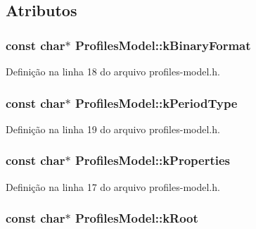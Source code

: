 \subsection{Atributos}
\subsubsection[{k\+Binary\+Format}]{\setlength{\rightskip}{0pt plus 5cm}const char$\ast$ Profiles\+Model\+::k\+Binary\+Format\hspace{0.3cm}{\ttfamily [static]}}\label{class_profiles_model_a3a78edee052fdbf9e4ffb894c2feb42f}


Definição na linha 18 do arquivo profiles-\/model.\+h.

\subsubsection[{k\+Period\+Type}]{\setlength{\rightskip}{0pt plus 5cm}const char$\ast$ Profiles\+Model\+::k\+Period\+Type\hspace{0.3cm}{\ttfamily [static]}}\label{class_profiles_model_a388efd77aaefa0ce4d687b3c79afbae6}


Definição na linha 19 do arquivo profiles-\/model.\+h.

\subsubsection[{k\+Properties}]{\setlength{\rightskip}{0pt plus 5cm}const char$\ast$ Profiles\+Model\+::k\+Properties\hspace{0.3cm}{\ttfamily [static]}}\label{class_profiles_model_af38e5d375a7f0560d867e13a7c385b92}


Definição na linha 17 do arquivo profiles-\/model.\+h.

\subsubsection[{k\+Root}]{\setlength{\rightskip}{0pt plus 5cm}const char$\ast$ Profiles\+Model\+::k\+Root\hspace{0.3cm}{\ttfamily [static]}}\label{class_profiles_model_a167d7ea088630f6e2f30f0ecb3aa61c3}



